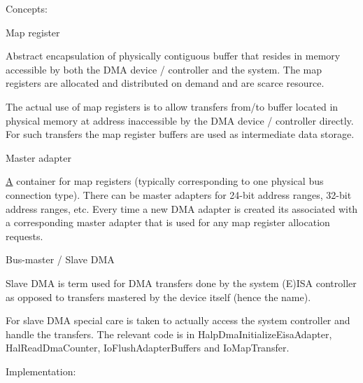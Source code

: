 Concepts\+:


\begin{DoxyItemize}
\item Map register

Abstract encapsulation of physically contiguous buffer that resides in memory accessible by both the D\+MA device / controller and the system. The map registers are allocated and distributed on demand and are scarce resource.

The actual use of map registers is to allow transfers from/to buffer located in physical memory at address inaccessible by the D\+MA device / controller directly. For such transfers the map register buffers are used as intermediate data storage.
\item Master adapter

\hyperlink{struct_a}{A} container for map registers (typically corresponding to one physical bus connection type). There can be master adapters for 24-\/bit address ranges, 32-\/bit address ranges, etc. Every time a new D\+MA adapter is created it\textquotesingle{}s associated with a corresponding master adapter that is used for any map register allocation requests.
\item Bus-\/master / Slave D\+MA

Slave D\+MA is term used for D\+MA transfers done by the system (E)I\+SA controller as opposed to transfers mastered by the device itself (hence the name).

For slave D\+MA special care is taken to actually access the system controller and handle the transfers. The relevant code is in Halp\+Dma\+Initialize\+Eisa\+Adapter, Hal\+Read\+Dma\+Counter, Io\+Flush\+Adapter\+Buffers and Io\+Map\+Transfer.
\end{DoxyItemize}

Implementation\+:


